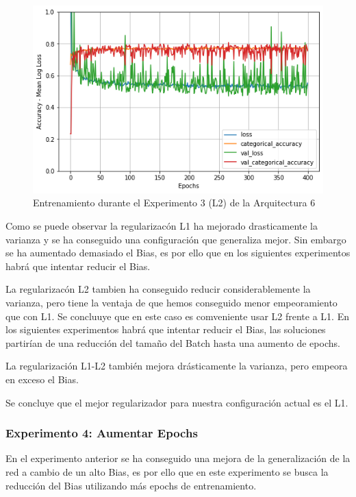 \documentclass{article}
\begin{document}
   \begin{figure}[!h]
				\begin{center}
					\includegraphics[scale=0.5]{tr-a6-e3.1.png}		
					\caption{Entrenamiento durante el Experimento 3 (L2) de la Arquitectura 6}	
					\label{tab:tr-a6-e2}
				\end{center}
			\end{figure}
    Como se puede observar la regularizac\'on L1 ha mejorado drasticamente la varianza y se ha conseguido una configuraci\'on que generaliza mejor. Sin embargo se ha aumentado demasiado el Bias, es por ello que en los siguientes experimentos habr\'a que intentar reducir el Bias. 
    
           La regularizac\'on L2 tambien ha conseguido reducir considerablemente la varianza, pero tiene la ventaja de que hemos conseguido menor empeoramiento que con L1. Se concluuye que en este caso es comveniente usar L2 frente a L1. En los siguientes experimentos habr\'a que intentar reducir el Bias, las soluciones partir\'ian de una reducci\'on del tama\~{n}o del Batch hasta una aumento de epochs. 
           
  La regularizaci\'on L1-L2 tambi\'en mejora dr\'asticamente la varianza, pero empeora en exceso el Bias. 

  Se concluye que el mejor regularizador para nuestra configuraci\'on actual es el L1. 
  
   

   
        \subsubsection{Experimento 4: Aumentar Epochs}
        En el experimento anterior se ha conseguido una mejora de la generalizaci\'on de la red a cambio de un alto Bias, es por ello que en este experimento se busca la reducci\'on del Bias utilizando m\'as epochs de entrenamiento. 
        
\end{document}
